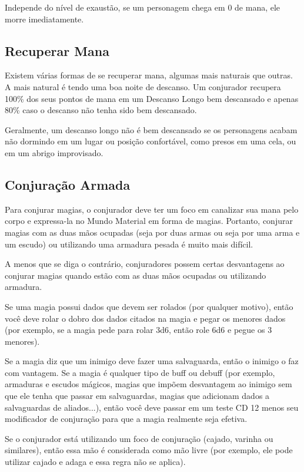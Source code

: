 \begin{multicols}{2}
Independe do nível de exaustão, se um personagem chega em $0$ de mana, ele
morre imediatamente.

\subsection*{Recuperar Mana}%
\label{sub:recuperar_mana}

Existem várias formas de se recuperar mana, algumas mais naturais que outras.
A mais natural é tendo uma boa noite de descanso. Um conjurador recupera 100\%
dos seus pontos de mana em um Descanso Longo bem descansado e apenas 80\% caso o
descanso não tenha sido bem descansado.

Geralmente, um descanso longo não é bem descansado se os personagens acabam não
dormindo em um lugar ou posição confortável, como presos em uma cela, ou em um
abrigo improvisado.

\subsection*{Conjuração Armada}%

Para conjurar magias, o conjurador deve ter um foco em canalizar sua mana pelo
corpo e expressa-la no Mundo Material em forma de magias. Portanto, conjurar
magias com as duas mãos ocupadas (seja por duas armas ou seja por uma arma e um
escudo) ou utilizando uma armadura pesada é muito mais difícil.

A menos que se diga o contrário, conjuradores possem certas desvantagens ao
conjurar magias quando estão com as duas mãos ocupadas ou utilizando armadura.

Se uma magia possui dados que devem ser rolados (por qualquer motivo), então você
deve rolar o dobro dos dados citados na magia e pegar os menores dados (por
exemplo, se a magia pede para rolar 3d6, então role 6d6 e pegue os 3 menores).

Se a magia diz que um inimigo deve fazer uma salvaguarda, então o inimigo o faz
com vantagem. Se a magia é qualquer tipo de buff ou debuff (por exemplo,
armaduras e escudos mágicos, magias que impõem desvantagem ao inimigo sem que ele
tenha que passar em salvaguardas, magias que adicionam dados a salvaguardas de
aliados...), então você deve passar em um teste CD 12 menos seu modificador de
conjuração para que a magia realmente seja efetiva.

Se o conjurador está utilizando um foco de conjuração (cajado, varinha ou
similares), então essa mão é considerada como mão livre (por exemplo, ele pode
utilizar cajado e adaga e essa regra não se aplica).


\end{multicols}
